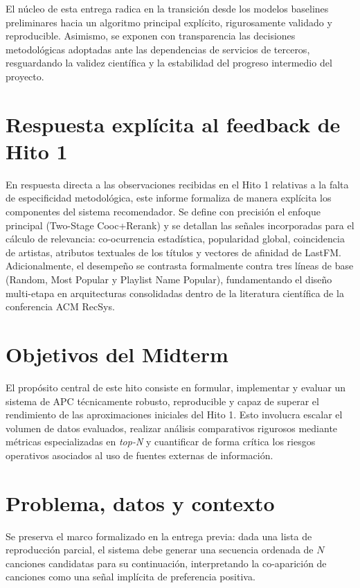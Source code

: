 \documentclass[10pt,letterpaper]{article}
\begin{document}
El núcleo de esta entrega radica en la transición desde los modelos baselines preliminares hacia un algoritmo principal explícito, rigurosamente validado y reproducible. Asimismo, se exponen con transparencia las decisiones metodológicas adoptadas ante las dependencias de servicios de terceros, resguardando la validez científica y la estabilidad del progreso intermedio del proyecto.

\section{Respuesta explícita al feedback de Hito 1}

En respuesta directa a las observaciones recibidas en el Hito 1 relativas a la falta de especificidad metodológica, este informe formaliza de manera explícita los componentes del sistema recomendador. Se define con precisión el enfoque principal (Two-Stage Cooc+Rerank) y se detallan las señales incorporadas para el cálculo de relevancia: co-ocurrencia estadística, popularidad global, coincidencia de artistas, atributos textuales de los títulos y vectores de afinidad de LastFM. Adicionalmente, el desempeño se contrasta formalmente contra tres líneas de base (Random, Most Popular y Playlist Name Popular), fundamentando el diseño multi-etapa en arquitecturas consolidadas dentro de la literatura científica de la conferencia ACM RecSys.

\section{Objetivos del Midterm}

El propósito central de este hito consiste en formular, implementar y evaluar un sistema de APC técnicamente robusto, reproducible y capaz de superar el rendimiento de las aproximaciones iniciales del Hito 1. Esto involucra escalar el volumen de datos evaluados, realizar análisis comparativos rigurosos mediante métricas especializadas en \textit{top-N} y cuantificar de forma crítica los riesgos operativos asociados al uso de fuentes externas de información.

\section{Problema, datos y contexto}

Se preserva el marco formalizado en la entrega previa: dada una lista de reproducción parcial, el sistema debe generar una secuencia ordenada de $N$ canciones candidatas para su continuación, interpretando la co-aparición de canciones como una señal implícita de preferencia positiva.
\end{document}
